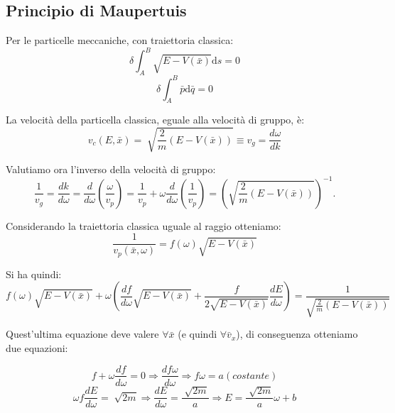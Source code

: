\subsection{Principio di Maupertuis} %
Per le particelle meccaniche, con traiettoria classica:
\begin{equation}
\delta \int_{A}^{B}{\sqrt{E-V(\bar x)} \textrm{d}s}=0
\end{equation}
\begin{equation}
\delta \int_{A}^{B}{\bar p \textrm{d}\bar q}=0
\end{equation}

La velocità della particella classica, eguale alla velocità di gruppo, è:
\begin{equation}
v_c\left(E, \bar x\right)=\sqrt[]{\frac{2}{m}(E-V(\bar x))}\equiv v_g=\frac{d\omega}{dk}
\end{equation}

Valutiamo ora l'inverso della velocità di gruppo:
\begin{equation}
\label{eq:inversa_vel_gruppo}
\frac{1}{v_g}=\frac{dk}{d\omega}=\frac{d}{d\omega}\left(\frac{\omega}{v_p}\right)=\frac{1}{v_p}+\omega\frac{d}{d\omega}\left(\frac{1}{v_p}\right)=\left(\sqrt{\frac{2}{m}(E-V(\bar x))}\right)^{-1}.
\end{equation}

Considerando la traiettoria classica uguale al raggio otteniamo:
\begin{equation}
\label{eq:inversa_vel_fase_classica}
\frac{1}{v_p(\bar x,\omega)}=f(\omega)\sqrt{E-V(\bar x)}
\end{equation}

Si ha quindi:
\begin{equation}
f\left(\omega \right)\sqrt{E-V\left(\bar x\right)}+\omega \left(\frac{df}{d\omega }\sqrt{E-V\left(\bar x\right)}+\frac{f}{2\sqrt{E-V\left(\bar x\right)}}\frac{dE}{d\omega }\right)=\frac{1}{\sqrt{\frac{2}{m}\left(E-V\left(\bar x\right)\right)}}
\end{equation}


Quest'ultima equazione deve valere $\forall \bar x$ (e quindi $\forall \bar v_x$), di conseguenza otteniamo due equazioni:

\begin{equation}
f+\omega \frac{df}{d\omega }=0 \Longrightarrow \frac{df\omega }{d\omega }\Longrightarrow f\omega =a (costante)
\end{equation}
\begin{equation}
\omega f\frac{dE}{d\omega }=\sqrt[]{2m}\Longrightarrow \frac{dE}{d\omega }=\frac{\sqrt[]{2m}}{a}\Longrightarrow E=\frac{\sqrt[]{2m}}{a}\omega +b
\end{equation}

